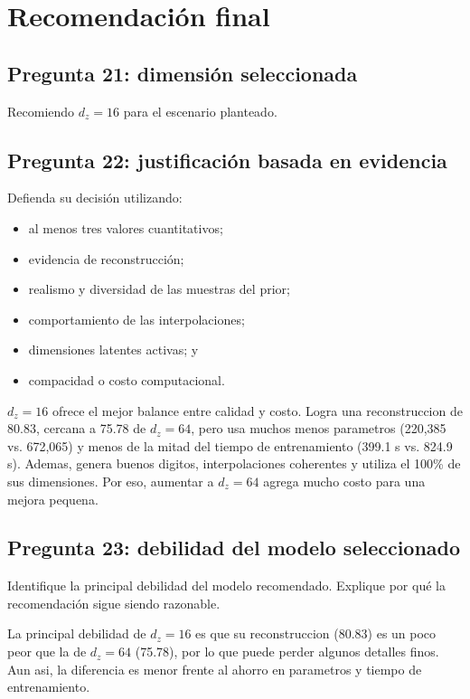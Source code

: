 \documentclass[11pt,letterpaper]{article}
\begin{document}
\section{Recomendación final}

\subsection*{Pregunta 21: dimensión seleccionada}
\begin{center}
\Large Recomiendo $d_z=\boxed{16}$ para el escenario planteado.
\end{center}

\subsection*{Pregunta 22: justificación basada en evidencia}
Defienda su decisión utilizando:
\begin{itemize}[leftmargin=*]
  \item al menos tres valores cuantitativos;
  \item evidencia de reconstrucción;
  \item realismo y diversidad de las muestras del prior;
  \item comportamiento de las interpolaciones;
  \item dimensiones latentes activas; y
  \item compacidad o costo computacional.
\end{itemize}
\begin{responsebox}
$d_z=16$ ofrece el mejor balance entre calidad y costo. Logra una reconstruccion de 80.83, cercana a 75.78 de $d_z=64$, pero usa muchos menos parametros (220,385 vs. 672,065) y menos de la mitad del tiempo de entrenamiento (399.1 s vs. 824.9 s). Ademas, genera buenos digitos, interpolaciones coherentes y utiliza el 100\% de sus dimensiones. Por eso, aumentar a $d_z=64$ agrega mucho costo para una mejora pequena.
\end{responsebox}

\subsection*{Pregunta 23: debilidad del modelo seleccionado}
Identifique la principal debilidad del modelo recomendado. Explique por qué la
recomendación sigue siendo razonable.
\begin{responsebox}
La principal debilidad de $d_z=16$ es que su reconstruccion (80.83) es un poco peor que la de $d_z=64$ (75.78), por lo que puede perder algunos detalles finos. Aun asi, la diferencia es menor frente al ahorro en parametros y tiempo de entrenamiento.
\end{responsebox}
\end{document}

